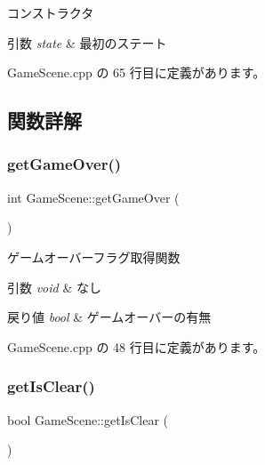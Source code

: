 コンストラクタ 


\begin{DoxyParams}{引数}
{\em state} & 最初のステート \\
\hline
\end{DoxyParams}


 Game\+Scene.\+cpp の 65 行目に定義があります。



\subsection{関数詳解}
\mbox{\label{class_game_scene_a2f8413f473bc9a937fa02bfd4678d61d}} 
\subsubsection{\texorpdfstring{get\+Game\+Over()}{getGameOver()}}
{\footnotesize\ttfamily int Game\+Scene\+::get\+Game\+Over (\begin{DoxyParamCaption}{ }\end{DoxyParamCaption})}



ゲームオーバーフラグ取得関数 


\begin{DoxyParams}{引数}
{\em void} & なし \\
\hline
\end{DoxyParams}

\begin{DoxyRetVals}{戻り値}
{\em bool} & ゲームオーバーの有無 \\
\hline
\end{DoxyRetVals}


 Game\+Scene.\+cpp の 48 行目に定義があります。

\mbox{\label{class_game_scene_a56604f01c0fa914660c3d8b788a94405}} 
\subsubsection{\texorpdfstring{get\+Is\+Clear()}{getIsClear()}}
{\footnotesize\ttfamily bool Game\+Scene\+::get\+Is\+Clear (\begin{DoxyParamCaption}{ }\end{DoxyParamCaption})}



